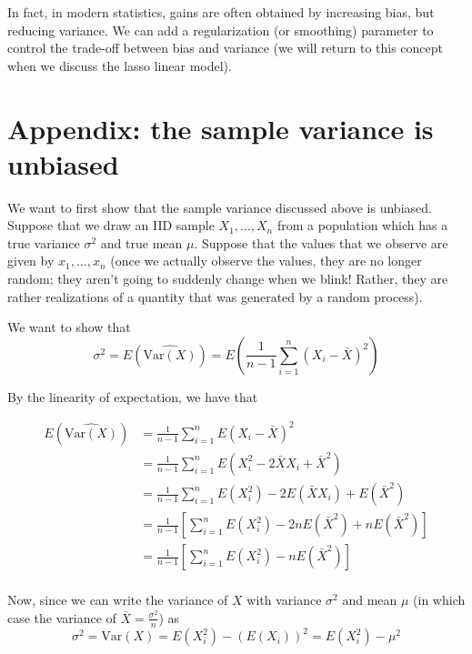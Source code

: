 In fact, in modern statistics, gains are often obtained by increasing bias, but reducing variance. We can add a regularization (or smoothing) parameter to control the trade-off between bias and variance (we will return to this concept when we discuss the lasso linear model).





\section{Appendix: the sample variance is unbiased}

We want to first show that the sample variance discussed above is unbiased. Suppose that we draw an IID sample $X_1, ..., X_n$ from a population which has a true variance $\sigma^2$ and true mean $\mu$. Suppose that the values that we observe are given by $x_1, ..., x_n$ (once we actually observe the values, they are no longer random; they aren't going to suddenly change when we blink! Rather, they are rather realizations of a quantity that was generated by a random process). 

We want to show that
$$\sigma^2 = E(\widehat{\text{Var}(X)}) = E\left( \frac{1}{n-1} \sum_{i=1}^n (X_i - \bar{X})^2\right)$$

By the linearity of expectation, we have that

\begin{align*}
E(\widehat{\text{Var}(X)}) & = \frac{1}{n-1} \sum_{i=1}^n E \left( X_i - \bar{X} \right)^2\\
& =  \frac{1}{n-1} \sum_{i=1}^n E\left( X_i^2 - 2 \bar{X} X_i + \bar{X}^2 \right)\\
& = \frac{1}{n-1} \sum_{i=1}^n E\left(X_i^2 \right) - 2 E\left(\bar{X} X_i \right) + E\left( \bar{X}^2 \right)\\
& = \frac{1}{n-1} \left[\sum_{i=1}^n E\left(X_i^2 \right) - 2 n E\left(\bar{X}^2 \right) + nE\left( \bar{X}^2 \right)\right]\\
& = \frac{1}{n-1} \left[\sum_{i=1}^n E\left(X_i^2 \right) - nE\left( \bar{X}^2 \right)\right]\\
\end{align*}


Now, since we can write the variance of $X$ with variance $\sigma^2$ and mean $\mu$ (in which case the variance of $\bar{X} = \frac{\sigma^2}{n}$) as 
$$\sigma^2 = \text{Var}(X) = E\left(X_i^2\right) - \left( E\left( X_i\right)\right)^2 =  E\left(X_i^2\right)  - \mu^2$$

